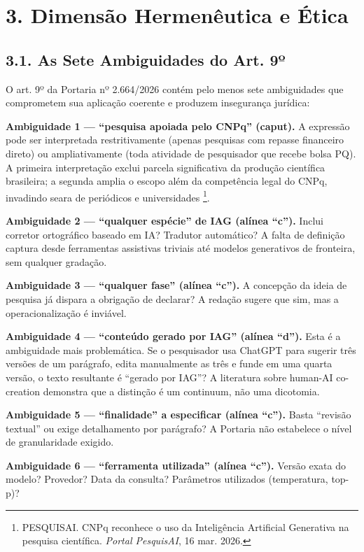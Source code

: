 \documentclass[
  12pt,
  a4paper,
  brazil,
  twoside
]{report}
\begin{document}
\section{3. Dimensão Hermenêutica e
Ética}\label{dimensuxe3o-hermenuxeautica-e-uxe9tica}

\subsection{3.1. As Sete Ambiguidades do Art.
9º}\label{as-sete-ambiguidades-do-art.-9uxba}

O art. 9º da Portaria nº 2.664/2026 contém pelo menos sete ambiguidades
que comprometem sua aplicação coerente e produzem insegurança jurídica:

\textbf{Ambiguidade 1 --- ``pesquisa apoiada pelo CNPq'' (caput).} A
expressão pode ser interpretada restritivamente (apenas pesquisas com
repasse financeiro direto) ou ampliativamente (toda atividade de
pesquisador que recebe bolsa PQ). A primeira interpretação exclui
parcela significativa da produção científica brasileira; a segunda
amplia o escopo além da competência legal do CNPq, invadindo seara de
periódicos e universidades \footnote{PESQUISAI. CNPq reconhece o uso da
  Inteligência Artificial Generativa na pesquisa científica.
  \emph{Portal PesquisAI}, 16 mar. 2026.}.

\textbf{Ambiguidade 2 --- ``qualquer espécie'' de IAG (alínea ``c'').}
Inclui corretor ortográfico baseado em IA? Tradutor automático? A falta
de definição captura desde ferramentas assistivas triviais até modelos
generativos de fronteira, sem qualquer gradação.

\textbf{Ambiguidade 3 --- ``qualquer fase'' (alínea ``c'').} A concepção
da ideia de pesquisa já dispara a obrigação de declarar? A redação
sugere que sim, mas a operacionalização é inviável.

\textbf{Ambiguidade 4 --- ``conteúdo gerado por IAG'' (alínea ``d'').}
Esta é a ambiguidade mais problemática. Se o pesquisador usa ChatGPT
para sugerir três versões de um parágrafo, edita manualmente as três e
funde em uma quarta versão, o texto resultante é ``gerado por IAG''? A
literatura sobre human-AI co-creation demonstra que a distinção é um
continuum, não uma dicotomia.

\textbf{Ambiguidade 5 --- ``finalidade'' a especificar (alínea ``c'').}
Basta ``revisão textual'' ou exige detalhamento por parágrafo? A
Portaria não estabelece o nível de granularidade exigido.

\textbf{Ambiguidade 6 --- ``ferramenta utilizada'' (alínea ``c'').}
Versão exata do modelo? Provedor? Data da consulta? Parâmetros
utilizados (temperatura, top-p)?
\end{document}
